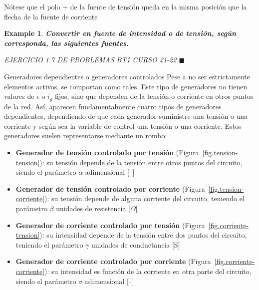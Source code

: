 \documentclass[11pt]{book} %
\makeatletter
\numberwithin{dummy}{section}
\theoremstyle{ocrenumbox}
\theoremstyle{blacknumex}
\newtheorem{exampleT}{Example}[chapter]
\theoremstyle{blacknumbox}
\theoremstyle{ocrenum}
\newenvironment{example}{\begin{exampleT}}{\hfill{\tiny\ensuremath{\blacksquare}}\end{exampleT}}
\newenvironment{remark}{\par\vspace{10pt}\small %
\begin{list}{}{
\leftmargin=35pt %
\rightmargin=25pt}\item\ignorespaces %
\makebox[-2.5pt]{\begin{tikzpicture}[overlay]
\node[draw=ocre!60,line width=1pt,circle,fill=ocre!25,font=\sffamily\bfseries,inner sep=2pt,outer sep=0pt] at (-15pt,0pt){\textcolor{ocre}{N}};\end{tikzpicture}} %
\advance\baselineskip -1pt}{\end{list}\vskip5pt} %
\renewcommand{\subsubsection}{\@startsection {subsubsection}{3}{\z@}
{-2ex \@plus -0.1ex \@minus -.2ex}
{.2ex \@plus.2ex }
{\normalfont\small\sffamily\bfseries}}
\newlength\esp
\makeatother
\begin{document}
	\begin{remark}
	    Nótese que el polo $+$ de la fuente de tensión queda en la misma posición que la flecha de la fuente de corriente
	\end{remark}
	
	\begin{example}
	    \textbf{Convertir en fuente de intensidad o de tensión, según corresponda, las siguientes fuentes. }
	    
	    EJERCICIO 1.7 DE PROBLEMAS BT1 CURSO 21-22
	\end{example}
	
	\subsubsection{Generadores dependientes o generadores controlados}
	Pese a no ser estrictamente elementos activos, se comportan como tales. Este tipo de generadores no tienen valores de $\epsilon$ o $i_g$ fijos, sino que dependen de la tensión o corriente en otros puntos de la red. Así, aparecen fundamentalmente cuatro tipos de generadores dependientes, dependiendo de que cada generador suministre una tensión o una corriente y según sea la variable de control una tensión o una corriente. Estos generadores suelen representarse mediante un rombo:
	\begin{itemize}
		\item \textbf{Generador de tensión controlado por tensión} (Figura~\ref{fig.tension-tension}): su tensión depende de la tensión entre otros puntos del circuito, siendo el parámetro $\alpha$ adimensional [--]
		\item \textbf{Generador de tensión controlado por corriente} (Figura~\ref{fig.tension-corriente}): su tensión depende de alguna corriente del circuito, teniendo el parámetro $\beta$ unidades de resistencia [$\Omega$]
		\item \textbf{Generador de corriente controlado por tensión} (Figura~\ref{fig.corriente-tension}): su intensidad depende de la tensión entre dos puntos del circuito, teniendo el parámetro $\gamma$ unidades de conductancia [S]
		\item \textbf{Generador de corriente controlado por corriente} (Figura~\ref{fig.corriente-corriente}): su intensidad es función de la corriente en otra parte del circuito, siendo el parámetro $\sigma$ adimensional [--]
	\end{itemize}
\end{document}
